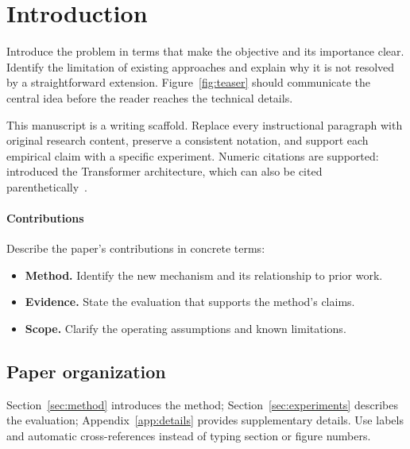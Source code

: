 \section{Introduction}\label{sec:introduction}
Introduce the problem in terms that make the objective and its importance
clear. Identify the limitation of existing approaches and explain why it is
not resolved by a straightforward extension. Figure~\ref{fig:teaser} should
communicate the central idea before the reader reaches the technical details.

This manuscript is a writing scaffold. Replace every instructional paragraph
with original research content, preserve a consistent notation, and support
each empirical claim with a specific experiment. Numeric citations are
supported: \citet{vaswani2017attention} introduced the Transformer architecture,
which can also be cited parenthetically~\citep{vaswani2017attention}.

\paragraph{Contributions}
Describe the paper's contributions in concrete terms:
\begin{itemize}
  \item \textbf{Method.} Identify the new mechanism and its relationship to prior work.
  \item \textbf{Evidence.} State the evaluation that supports the method's claims.
  \item \textbf{Scope.} Clarify the operating assumptions and known limitations.
\end{itemize}

\subsection{Paper organization}
Section~\ref{sec:method} introduces the method;
Section~\ref{sec:experiments} describes the evaluation;
Appendix~\ref{app:details} provides supplementary details. Use labels and
automatic cross-references instead of typing section or figure numbers.
